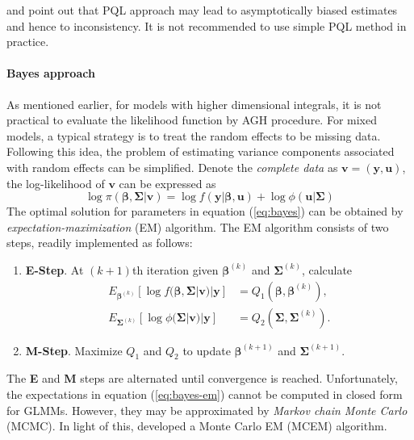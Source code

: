 \citet{breslow1995bias}  and \citet{pinheiro2006efficient} point out that PQL approach may lead to
asymptotically biased estimates and hence to inconsistency. It is not recommended to use simple PQL
method in practice. 


\paragraph{Bayes approach}
As mentioned earlier, for models with higher dimensional integrals, it is not practical to
evaluate the likelihood function by AGH procedure. For mixed models, a typical strategy is to treat
the random effects to be missing data. Following this idea, the problem of estimating variance
components associated with random effects can be simplified. Denote the \textit{complete data} as
$\bm v = (\bm y, \bm u)$, the log-likelihood of $\bm v$ can be expressed as 
\begin{equation}\label{eq:bayes}
	\log \pi(\bm \beta , \bm \Sigma|\bm v) = \log f(\bm y|\bm \beta, \bm u) + \log \phi(\bm u|\bm
	\Sigma)
\end{equation}  
The optimal solution for parameters in equation (\ref{eq:bayes}) can be obtained by
\textit{expectation-maximization} (EM) algorithm. The EM algorithm consists of two steps, readily 
implemented as follows:
\begin{enumerate}
	\item \textbf{E-Step}. At $(k+1)$th iteration given $\bm \beta^{(k)}$ and $\bm\Sigma^{(k)}$,  
	calculate 
	\begin{equation}\label{eq:bayes-em}
		\begin{aligned}
			E_{\bm \beta^{(k)}}[\log f(\bm \beta , \bm \Sigma|\bm v)|\bm y]&= Q_1(\bm \beta, \bm 
			\beta^{(k)}),\\
			E_{\bm \Sigma^{(k)}}[\log \phi(\bm \Sigma|\bm v)|\bm y]&= Q_2(\bm \Sigma, \bm 
			\Sigma^{(k)}).
		\end{aligned}
	\end{equation}
	\item \textbf{M-Step}. Maximize $Q_1$ and $Q_2$ to update  $\bm \beta^{(k+1)}$ and
	$\bm\Sigma^{(k+1)}$.
\end{enumerate}
The \textbf{E} and \textbf{M} steps are alternated until convergence is reached. Unfortunately, the
expectations in equation (\ref{eq:bayes-em}) cannot be computed in closed form for GLMMs. However,
they may be approximated by \textit{Markov chain Monte Carlo} (MCMC). In light of this,
\citet{mcculloch1997maximum} developed a Monte Carlo EM (MCEM) algorithm. 

